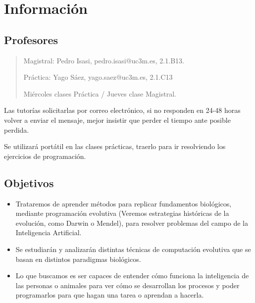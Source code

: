 \documentclass[12pt, twoside, openright]{report} %
\begin{document}
\listoffigures
\thispagestyle{fancy}

\listoftables
\thispagestyle{fancy}





\chapter{Información}

\section{Profesores}
\begin{quote}
	Magistral: Pedro Isasi, pedro.isasi@uc3m.es, 2.1.B13.
	
	Práctica: Yago Sáez, yago.saez@uc3m.es, 2.1.C13
	
	Miércoles clases Práctica / Jueves clase Magistral.
\end{quote}

Las tutorías solicitarlas por correo electrónico, si no responden en 24-48 horas volver a enviar el mensaje, mejor insistir que perder el tiempo ante posible perdida.

Se utilizará portátil en las clases prácticas, traerlo para ir resolviendo los ejercicios de programación.

\section{Objetivos}
\begin{itemize}
	\item Trataremos de aprender métodos para replicar fundamentos biológicos, mediante programación evolutiva (Veremos estrategias históricas de la evolución, como Darwin o Mendel), para resolver problemas del campo de la Inteligencia Artificial.
	\item Se estudiarán y analizarán distintas técnicas de computación evolutiva que se basan en distintos paradigmas biológicos.
	\item Lo que buscamos es ser capaces de entender cómo funciona la inteligencia de las personas o animales para ver cómo se desarrollan los procesos y poder programarlos para que hagan una tarea o aprendan a hacerla.
\end{itemize}
\end{document}
